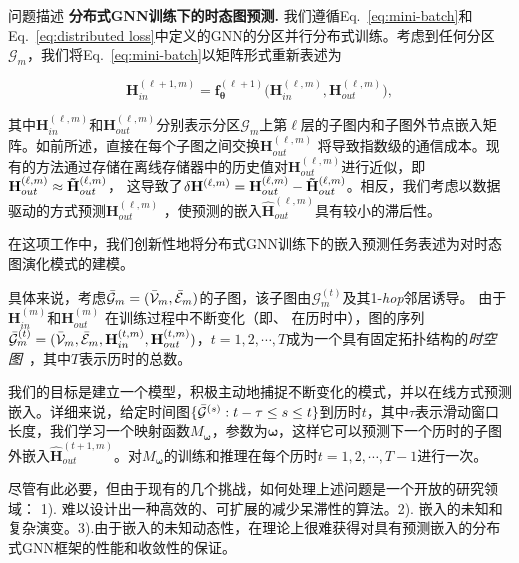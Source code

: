 \begin{section}{问题描述}
    \textbf{分布式GNN训练下的时态图预测.} 我们遵循Eq.~\ref{eq:mini-batch}和Eq.~\ref{eq:distributed loss}中定义的GNN的分区并行分布式训练。考虑到任何分区$\mathcal{G}_m$，我们将Eq.~\ref{eq:mini-batch}以矩阵形式重新表述为
    
    \begin{equation}
        \mathbf{H}_{in}^{(\ell+1,m)} = \boldsymbol{f}_{\boldsymbol{\theta}}^{(\ell+1)}\Big(\mathbf{H}_{in}^{(\ell,m)},\mathbf{H}_{out}^{(\ell,m)}\Big),
    \label{eq:matrix form forward}
    \end{equation}

    其中$\mathbf{H}_{in}^{(\ell,m)}$和$\mathbf{H}_{out}^{(\ell,m)}$分别表示分区$\mathcal{G}_m$上第$\ell$层的子图内和子图外节点嵌入矩阵。如前所述，直接在每个子图之间交换$\mathbf{H}_{out}^{(\ell,m)}$ 将导致指数级的通信成本。现有的方法通过存储在离线存储器中的历史值对$\mathbf{H}_{out}^{(\ell,m)}$进行近似，即 $\mathbf{H}_{out}^{(\ell,m)} \approx \mathbf{\Tilde{H}}_{out}^{(\ell,m)}$， 这导致了$\delta\mathbf{H}^{(\ell,m)} = \mathbf{H}_{out}^{(\ell,m)} - \mathbf{\Tilde{H}}_{out}^{(\ell,m)}$。相反，我们考虑以数据驱动的方式预测$\mathbf{H}_{out}^{(\ell,m)}$ ，使预测的嵌入$\mathbf{\hat{H}}_{out}^{(\ell,m)}$具有较小的滞后性。

    在这项工作中，我们创新性地将分布式GNN训练下的嵌入预测任务表述为对时态图演化模式的建模。

    具体来说，考虑$\mathcal{\Bar{G}}_{m}= (\mathcal{\Bar{V}}_{m},\mathcal{\Bar{E}}_{m})$的子图，该子图由$\mathcal{G}^{(t)}_{m}$及其1-\emph{hop}邻居诱导。
由于$\mathbf{H}_{in}^{(m)}$和$\mathbf{H}_{out}^{(m)}$ 在训练过程中不断变化（即、 在历时中），图的序列$\mathcal{\Bar{G}}^{(t)}_{m}= (\mathcal{\Bar{V}}_{m},\mathcal{\Bar{E}}_{m},\mathbf{H}_{in}^{(t,m)},\mathbf{H}_{out}^{(t,m)})$，$t=1,2,\cdots,T$成为一个具有固定拓扑结构的\emph{时空图}~\cite{wu2022graph}，其中$T$表示历时的总数。

我们的目标是建立一个模型，积极主动地捕捉不断变化的模式，并以在线方式预测嵌入。详细来说，给定时间图$\{\mathcal{\Bar{G}}^{(s)}: t-\tau\leq s\leq t\}$到历时$t$，其中$\tau$表示滑动窗口长度，我们学习一个映射函数$M_{\boldsymbol{\omega}}$，参数为$\boldsymbol{\omega}$，这样它可以预测下一个历时的子图外嵌入$\mathbf{\hat{H}}_{out}^{(t+1,m)}$。对$M_{\boldsymbol{\omega}}$的训练和推理在每个历时$t=1,2,\cdots,T-1$进行一次。

尽管有此必要，但由于现有的几个挑战，如何处理上述问题是一个开放的研究领域： 1). 难以设计出一种高效的、可扩展的减少呆滞性的算法。2). 嵌入的未知和复杂演变。3).由于嵌入的未知动态性，在理论上很难获得对具有预测嵌入的分布式GNN框架的性能和收敛性的保证。


\end{section}
